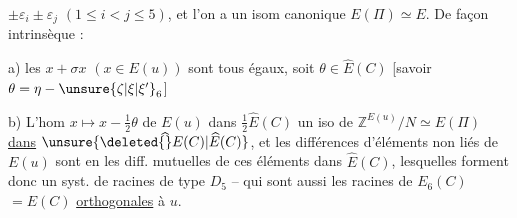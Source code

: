 $\pm\varepsilon_i\pm\varepsilon_j$ $(1\le i<j\le5)$, et l'on a un isom canonique $E(\Pi)\simeq E$. De façon intrinsèque :

a) les $x+\sigma x$ $(x\in E(u))$ sont tous égaux, soit $\theta\in\widehat E(C)$ [savoir $\theta=\eta-\unsure{\zeta|\xi|\xi'}_6$]

b) L'hom $x\longmapsto x-\frac12\theta$ de $E(u)$ dans $\frac12\widehat E(C)$  un iso de $\mathbb Z^{E(u)}/N\simeq E(\Pi)$  \uline{dans} $\unsure{\deleted{\widehat{\vphantom E}}E(C)|\widehat E(C)}$, et les différences    d'éléments non liés de $E(u)$ sont  en les diff. mutuelles de ces éléments dans $\widehat E(C)$, lesquelles forment donc un syst. de  racines de type $D_5$ -- qui sont aussi les  racines de $E_6(C)$  $=E(C)$ \uline{orthogonales} à $u$.
